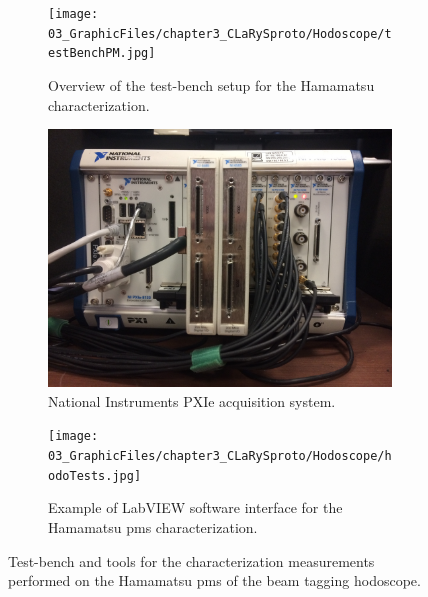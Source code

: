 \begin{figure}
\begin{subfigure}[t]{1\textwidth}
\centering
\texttt{[image: 03\_GraphicFiles/chapter3\_CLaRySproto/Hodoscope/testBenchPM.jpg]}
\caption{Overview of the test-bench setup for the Hamamatsu  characterization.}
\label{chap3::fig::hodo_testBenchPM}
\end{subfigure}
\newline
\begin{subfigure}[t]{.5\textwidth}
\centering
\includegraphics[width=1\textwidth, height = 5.cm]{03_GraphicFiles/chapter3_CLaRySproto/Electronics_Acquisition/PXI_ipnl.jpg}
\caption{National Instruments PXIe acquisition system.}
\label{chap3::fig::PXI_NI}
\end{subfigure}
\begin{subfigure}[t]{.5\textwidth}
\centering
\texttt{[image: 03\_GraphicFiles/chapter3\_CLaRySproto/Hodoscope/hodoTests.jpg]}
\caption{Example of LabVIEW software interface for the Hamamatsu 	\glspl{pm} characterization.}
\label{chap3::fig::hodo_LabView}
\end{subfigure}
\caption{Test-bench and tools for the characterization measurements performed on the Hamamatsu \glspl{pm} of the beam tagging hodoscope.}
\label{chap3::fig::hodoPMtest}
\end{figure}

